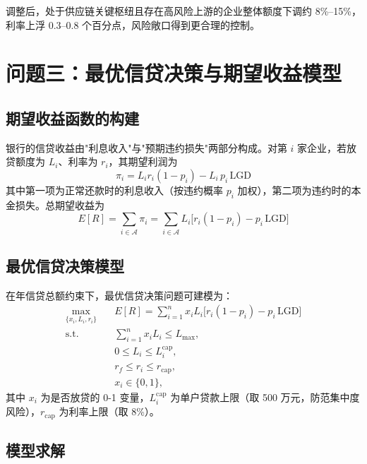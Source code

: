 \documentclass[12pt]{ctexart}
\begin{document}
调整后，处于供应链关键枢纽且存在高风险上游的企业整体额度下调约 8\%--15\%，利率上浮 0.3--0.8 个百分点，风险敞口得到更合理的控制。

\section{问题三：最优信贷决策与期望收益模型}

\subsection{期望收益函数的构建}

银行的信贷收益由"利息收入"与"预期违约损失"两部分构成。对第 $i$ 家企业，若放贷额度为 $L_i$、利率为 $r_i$，其期望利润为
\begin{equation}
\pi_i = L_i r_i (1-p_i) - L_i\, p_i\,\mathrm{LGD}
\label{eq:profit}
\end{equation}
其中第一项为正常还款时的利息收入（按违约概率 $p_i$ 加权），第二项为违约时的本金损失。总期望收益为
\begin{equation}
E[R] = \sum_{i\in\mathcal{A}} \pi_i = \sum_{i\in\mathcal{A}} L_i\big[r_i(1-p_i)-p_i\,\mathrm{LGD}\big]
\end{equation}

\subsection{最优信贷决策模型}

在年信贷总额约束下，最优信贷决策问题可建模为：
\begin{equation}
\begin{aligned}
\max_{\{x_i,L_i,r_i\}} \quad & E[R] = \sum_{i=1}^{n} x_i L_i\big[r_i(1-p_i)-p_i\,\mathrm{LGD}\big]\\
\mathrm{s.t.}\quad & \sum_{i=1}^{n} x_i L_i \leq L_{\max},\\
& 0 \leq L_i \leq L_i^{\mathrm{cap}},\\
& r_f \leq r_i \leq r_{\mathrm{cap}},\\
& x_i \in\{0,1\},
\end{aligned}
\label{eq:opt}
\end{equation}
其中 $x_i$ 为是否放贷的 0-1 变量，$L_i^{\mathrm{cap}}$ 为单户贷款上限（取 500 万元，防范集中度风险），$r_{\mathrm{cap}}$ 为利率上限（取 8\%）。

\subsection{模型求解}
\end{document}
